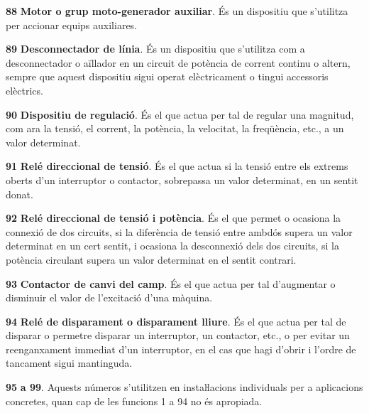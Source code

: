 \begin{multicols}{2}
\begin{list}{}
\item[\textbf{88}]  
 \textbf{Motor o grup moto-generador auxiliar}. És un dispositiu que s'utilitza per
accionar equips auxiliares.

\item[\textbf{89}]  
 \textbf{Desconnectador de línia}. És
un dispositiu que s'utilitza com a desconnectador o aïllador en un
circuit de potència de corrent continu o altern, sempre que aquest
dispositiu sigui operat elèctricament o tingui accessoris elèctrics.

\item[\textbf{90}]   
\textbf{Dispositiu de regulació}. És el que
actua per tal de regular una magnitud, com ara la tensió, el corrent, la potència,
la velocitat, la freqüència, etc., a un valor determinat.

\item[\textbf{91}]   
\textbf{Relé direccional de tensió}.
És el que actua si la tensió entre els extrems oberts d'un
interruptor o contactor, sobrepassa un valor determinat, en un
sentit donat.

\item[\textbf{92}]   
\textbf{Relé direccional de tensió i potència}. És el que permet o ocasiona la connexió de
dos circuits, si la diferència de tensió entre ambdós supera un
valor determinat en un cert sentit, i ocasiona la desconnexió dels
dos circuits, si la potència circulant supera un valor determinat
en el sentit contrari.

\item[\textbf{93}]   
\textbf{Contactor de canvi del camp}. És el
que actua per tal d'augmentar o disminuir el valor de l'excitació
d'una màquina.

\item[\textbf{94}]   
\textbf{Relé de disparament o disparament lliure}. És el que actua per tal de disparar o permetre disparar un
interruptor, un contactor, etc., o per evitar un reenganxament
immediat d'un interruptor, en el cas que hagi d'obrir i l'ordre de
tancament sigui mantinguda.

\item[\textbf{95}] \textbf{a 99}. Aquests números s'utilitzen en instaŀlacions
individuals per a aplicacions concretes, quan cap de les funcions 1
a 94 no és apropiada.

\end{list}
\end{multicols}


